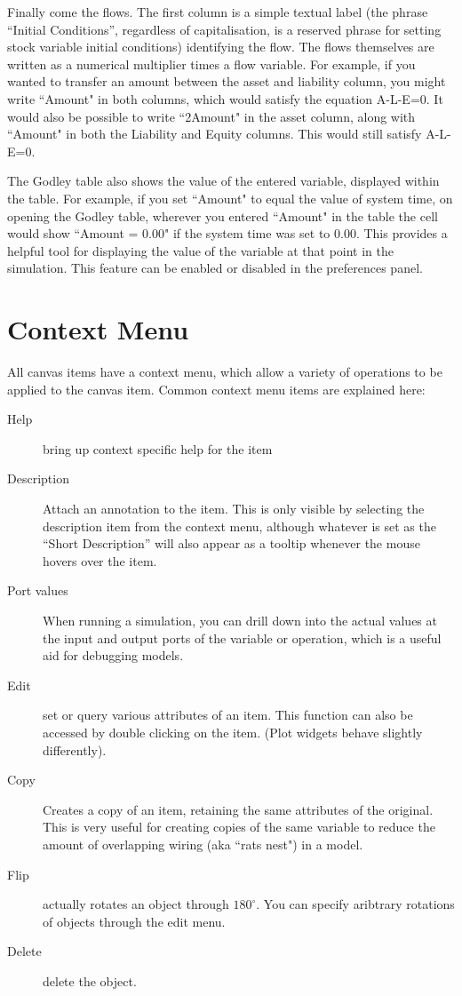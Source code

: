 Finally come the flows. The first column is a simple textual label
(the phrase ``Initial Conditions'', regardless of capitalisation, is a
reserved phrase for setting stock variable initial conditions)
identifying the flow. The flows themselves are written as a numerical
multiplier times a flow variable. For example, if you wanted to
transfer an amount between the asset and liability column, you might
write ``Amount" in both columns, which would satisfy the equation
A-L-E=0.  It would also be possible to write ``2Amount" in the asset
column, along with ``Amount" in both the Liability and Equity
columns. This would still satisfy A-L-E=0.

The Godley table also shows the value of the entered variable,
displayed within the table.  For example, if you set ``Amount" to
equal the value of system time, on opening the Godley table, wherever
you entered ``Amount" in the table the cell would show ``Amount =
0.00" if the system time was set to 0.00. This provides a helpful tool
for displaying the value of the variable at that point in the
simulation.  This feature can be enabled or disabled in the
preferences panel.

\section{Context Menu}

All canvas items have a context menu, which allow a variety of
operations to be applied to the canvas item. Common context menu items
are explained here:
\begin{description}
\item[Help] bring up context specific help for the item
\item[Description] Attach an annotation to the item. This is only
  visible by selecting the description item from the context menu,
  although whatever is set as the ``Short Description'' will also
  appear as a tooltip whenever the mouse hovers over the item.
\item[Port values] When running a simulation, you can drill down into
  the actual values at the input and output ports of the variable or
  operation, which is a useful aid for debugging models.
\item[Edit] set or query various attributes of an item. This function
  can also be accessed by double clicking on the item. (Plot widgets
  behave slightly differently).
\item[Copy] Creates a copy of an item, retaining the same attributes
  of the original. This is very useful for creating copies of the same
  variable to reduce the amount of overlapping wiring (aka ``rats
  nest") in a model.
\item[Flip] actually rotates an object through $180^\circ$. You can
  specify aribtrary rotations of objects through the edit menu.
\item[Delete] delete the object.
\end{description}

